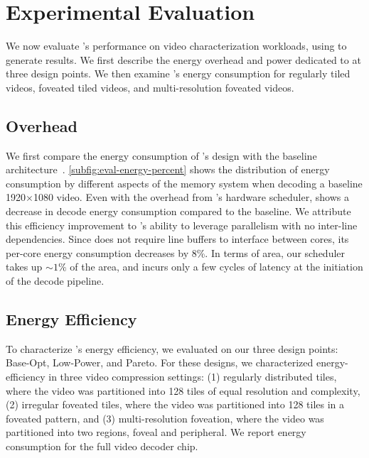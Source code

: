 
\section{Experimental Evaluation}

We now evaluate \nameArch's performance on video characterization workloads, using \nameArchprof to generate results.
We first describe the energy overhead and power dedicated to \nameArch at three design points.
We then examine \nameArch's energy consumption for regularly tiled videos, foveated tiled videos, and multi-resolution foveated videos.

\evalEnergyPower


\subsection{\nameArch Overhead}
We first compare the energy consumption of \nameArch's design with the baseline architecture~\cite{tikekar18ijssc}.
\ref{subfig:eval-energy-percent} shows the distribution of energy consumption by different aspects of the memory system when decoding a baseline 1920$\times$1080 video.
Even with the overhead from \nameArch's hardware scheduler, \nameArch shows a decrease in decode energy consumption compared to the baseline. We attribute this efficiency improvement to \nameArch's ability to leverage parallelism with no inter-line dependencies.
Since \nameArch does not require line buffers to interface between cores, its per-core energy consumption decreases by 8\%.
In terms of area, our scheduler takes up $\sim1\%$ of the area, and incurs only a few cycles of latency at the initiation of the decode pipeline.

\subsection{Energy Efficiency}
To characterize \nameArch's energy efficiency, we evaluated on our three \nameArch design points: Base-Opt, Low-Power, and Pareto. For these designs, we characterized energy-efficiency in three video compression settings: (1) regularly distributed tiles, where the video was partitioned into 128 tiles of equal resolution and complexity, (2) irregular foveated tiles, where the video was partitioned into 128 tiles in a foveated pattern, and (3) multi-resolution foveation, where the video was partitioned into two regions, foveal and peripheral. We report energy consumption for the full video decoder chip.

\evalRegularTileEnergy

